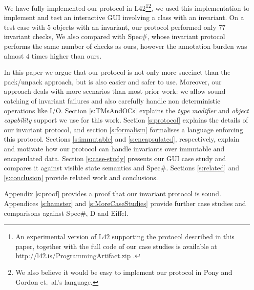 We have fully implemented our protocol in L42\footnote{An experimental version of L42 supporting the protocol described in this paper, together with the full code of our case studies is available at \url{http://l42.is/ProgrammingArtifact.zip} .}\footnote{We also believe it would be easy to implement our protocol in Pony and Gordon et.~al.'s language.}, we used this implementation to implement and test an interactive GUI involving a class with an invariant. On a test case with $5$ objects with an invariant, 
our protocol performed only $77$ invariant checks, 
We also compared with Spec\#, whose invariant protocol performs the same number of checks as ours, however the annotation burden was almost $4$ times higher than ours.


In this paper we argue that our protocol is not only more succinct than the pack/unpack approach, but is also easier and safer to use.
Moreover, our approach deals with more scenarios than most prior work: we allow sound catching of invariant failures and also carefully handle non deterministic operations like I/O.
Section \ref{s:TMsAndOCs} explains the \emph{type modifier} and \emph{object capability} support we use for this work.
Section \ref{s:protocol} explains the details of our invariant protocol, and section \ref{s:formalism} formalises a language enforcing this protocol.
Sections \ref{s:immutable} and \ref{s:encapsulated}, respectively, explain and motivate how our protocol can handle invariants over immutable and encapsulated data.
Section \ref{s:case-study} presents our GUI case study and compares it against visible state semantics and Spec\#.
Sections \ref{s:related} and \ref{s:conclusion} provide related work and conclusions.

Appendix \ref{s:proof} provides a proof that our invariant protocol is sound. Appendices \ref{s:hamster} and \ref{s:MoreCaseStudies} provide further
case studies and comparisons against Spec\#, D and Eiffel.

